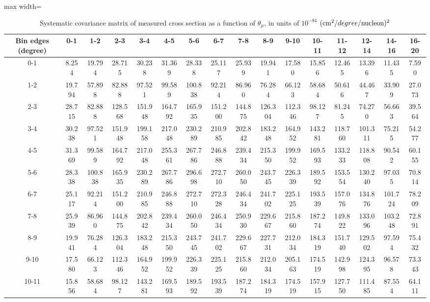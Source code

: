 \documentclass[11pt]{article}
\begin{document}
\begin{table}
  \centering
  \renewcommand{\arraystretch}{1.15}
  \caption{Systematic covariance matrix of measured cross section as a function of $\theta_{\mu}$, in units of $10^{-84}$ $(\mbox{cm}^2/degree/\mathrm{nucleon})^2$}
  \begin{adjustbox}{max width=\textwidth}
    \begin{tabular}{c||ccccccccccccccc}
      Bin edges (degree) & 0-1 & 1-2 & 2-3 & 3-4 & 4-5 & 5-6 & 6-7 & 7-8 & 8-9 & 9-10 & 10-11 & 11-12 & 12-14 & 14-16 & 16-20\\
      \hline
      \hline
      0-1 & 8.254 & 19.794 & 28.715 & 30.238 & 31.369 & 28.338 & 25.117 & 25.939 & 19.941 & 17.580 & 15.856 & 12.465 & 13.396 & 11.435 & 7.590\\
      1-2 & 19.794 & 57.898 & 82.888 & 97.521 & 99.589 & 100.838 & 92.214 & 86.960 & 76.284 & 66.123 & 58.684 & 50.616 & 44.467 & 33.909 & 27.073\\
      2-3 & 28.715 & 82.888 & 128.568 & 151.948 & 164.792 & 165.935 & 151.200 & 144.875 & 126.304 & 112.346 & 98.127 & 81.245 & 74.270 & 56.663 & 39.564\\
      3-4 & 30.238 & 97.521 & 151.948 & 199.158 & 217.048 & 230.289 & 210.985 & 202.842 & 183.248 & 164.952 & 143.281 & 118.760 & 101.311 & 75.215 & 54.277\\
      4-5 & 31.369 & 99.589 & 164.792 & 217.048 & 255.361 & 267.786 & 246.888 & 239.434 & 215.350 & 199.952 & 169.593 & 133.233 & 118.808 & 90.542 & 60.155\\
      5-6 & 28.338 & 100.838 & 165.935 & 230.289 & 267.786 & 296.698 & 272.710 & 260.050 & 243.745 & 226.339 & 189.592 & 153.554 & 130.240 & 97.035 & 70.814\\
      6-7 & 25.117 & 92.214 & 151.200 & 210.985 & 246.888 & 272.710 & 272.328 & 246.434 & 241.702 & 225.125 & 193.539 & 157.076 & 134.876 & 101.724 & 78.209\\
      7-8 & 25.939 & 86.960 & 144.875 & 202.842 & 239.434 & 260.050 & 246.434 & 250.930 & 229.667 & 215.860 & 187.274 & 149.822 & 133.096 & 103.248 & 72.891\\
      8-9 & 19.941 & 76.284 & 126.304 & 183.248 & 215.350 & 243.745 & 241.702 & 229.667 & 227.731 & 212.034 & 184.319 & 151.740 & 129.502 & 97.594 & 75.432\\
      9-10 & 17.580 & 66.123 & 112.346 & 164.952 & 199.952 & 226.339 & 225.125 & 215.860 & 212.034 & 205.163 & 174.519 & 142.998 & 124.395 & 96.578 & 73.343\\
      10-11 & 15.856 & 58.684 & 98.127 & 143.281 & 169.593 & 189.592 & 193.539 & 187.274 & 184.319 & 174.519 & 157.915 & 127.750 & 111.485 & 87.554 & 64.111\\

\end{tabular}
\end{adjustbox}
\end{table}
\end{document}
